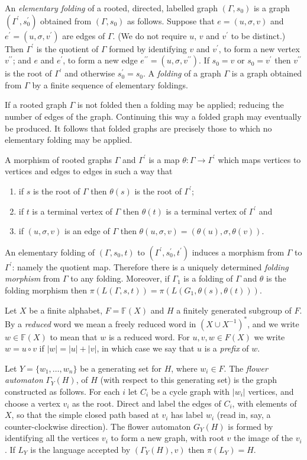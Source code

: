 \documentclass[a4paper,12pt]{article}
\newcommand{\G}{\Gamma }
\newcommand{\s}{\sigma }
\numberwithin{equation}{section}
\numberwithin{figure}{section}
\newcommand{\FF}{\ensuremath{\mathbb{F}}}
\newcommand{\maps}{\rightarrow}
\newcommand{\be}{\begin{enumerate}}
\newcommand{\ee}{\end{enumerate}}
\begin{document}
An {\em elementary folding} of a rooted, directed, labelled 
graph $(\G,s_0)$ is a
graph $(\G^\prime,s^\prime_0)$ obtained from $(\G,s_0)$ as
follows. Suppose that $e=(u, \s, v)$ and $e^\prime=(u, \s,
v^\prime)$ are edges of $\G$. (We do not require $u$, $v$ and
$v^\prime$ to be distinct.)
 Then $\G^\prime$ is the quotient of $\G$ formed by identifying
$v$ and $v^\prime$, to form a new vertex $v^{\prime\prime}$; and
$e$ and $e^\prime$, to form a new edge $e^{\prime\prime}=(u, \s,
v^{\prime\prime})$. If $s_0= v$ or $s_0 = v^\prime$ then
$v^{\prime\prime}$ is the root of $\G^\prime$ and otherwise
$s^\prime_0=s_0$.
 A {\em folding} of a graph $\G$ is a graph obtained
from $\G$ by a finite sequence of elementary foldings. 

If a rooted graph $\G$ is not folded then a folding may be applied; reducing the 
number of edges of the graph. Continuing this way a folded graph may eventually 
be produced. It follows that  folded graphs are precisely those 
to which no elementary folding may be applied. 

A morphism of  rooted 
graphs $\G$ and $\G^\prime$ is a map $\theta: \G\maps \G^\prime$ 
which maps vertices to vertices and edges to edges in such a way
that
\be
\item if $s$ is the root of $\G$ then $\theta(s)$ is the root of 
$\G^\prime$;  
\item if $t$ is a terminal vertex of $\G$ then $\theta(t)$ is a terminal 
vertex of 
$\G^\prime$ and
\item  if $(u,\sigma,v)$ is an edge of $\G$ then 
$\theta(u,\sigma,v)=(\theta(u),\sigma,\theta(v))$. 
\ee
An elementary
folding of  $(\G,s_0,t)$ to  $(\G^\prime,s^\prime_0, t^\prime)$ induces a morphism
from $\G$ to $\G^\prime$: namely the quotient map. Therefore there is
 a uniquely determined {\em folding morphism} from $\G$ to any folding. Moreover, if $\G_1$
is a folding of $\G$ and $\theta$ is the folding morphism then $\pi(L(\G,s,t))=
\pi(L(G_1,\theta(s),\theta(t)))$.   


Let $X$ be a finite alphabet, $F=\FF(X)$ and $H$ a finitely generated subgroup
of $F$.  By a {\em reduced} word we mean
 a freely reduced word in $(X\cup X^{-1})^\ast$, and we write $w\in \FF(X)$
to mean that $w$ is a reduced word. For $u,v, w\in F(X)$ we
write $w=u\circ v$ if $|w|=|u|+|v|$, in which case we say that $u$ is a {\em prefix}
of $w$. 

Let $Y=\{w_1,\ldots ,w_n\}$ be a generating set for $H$, where $w_i\in F$. 
The {\em flower automaton} $\G_Y(H)$, of $H$ (with respect to this generating set)
is the graph constructed as follows. For each $i$ let $C_i$ be a cycle
graph with $|w_i|$ vertices, and choose a vertex $v_i$ as the root. Direct
and label the edges of $C_i$, with elements of $X$,  
so that the simple closed path based at $v_i$ has
label $w_i$ (read in, say, a counter-clockwise direction). The flower
automaton $G_Y(H)$ is formed by identifying all the vertices $v_i$ to form 
a new graph, with root $v$ the image of the $v_i$. If $L_Y$ is the language  accepted
by $(\G_Y(H), v)$ then $\pi(L_Y)=H$. 
 
\end{document}
